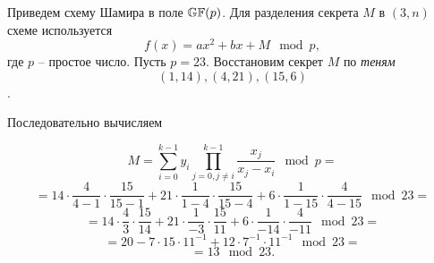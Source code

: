 \example
Приведем схему Шамира в поле $\mathbb{GF}(p)$. Для разделения секрета $M$ в $(3,n)$ схеме используется
    \[ f(x) = a x^2 + b x + M \mod p, \]
где $p$ -- простое число. Пусть $p=23$. Восстановим секрет $M$ по \emph{теням}
    \[ (1,14), (4,21), (15,6) \].

Последовательно вычисляем

    \[ M = \sum\limits_{i=0}^{k-1} y_i \prod\limits_{j=0, j \neq i}^{k-1} \frac{x_j}{x_j - x_i} \mod p = \]
    \[= 14 \cdot \frac{4}{4-1} \cdot \frac{15}{15-1} + 21 \cdot \frac{1}{1-4} \cdot \frac{15}{15-4} + 6 \cdot \frac{1}{1-15} \cdot \frac{4}{4-15} \mod 23 = \]
    \[ =14 \cdot \frac{4}{3} \cdot \frac{15}{14} + 21 \cdot \frac{1}{-3} \cdot \frac{15}{11} + 6 \cdot \frac{1}{-14} \cdot \frac{4}{-11} \mod 23 = \]
    \[= 20 - 7 \cdot 15 \cdot 11^{-1} + 12 \cdot 7^{-1} \cdot 11^{-1} \mod 23 = \]
    \[ = 13 \mod 23.\]
\exampleend
